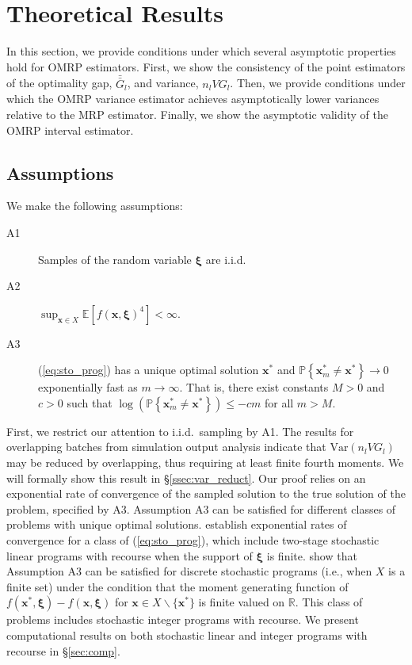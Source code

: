 \documentclass[12pt]{article}
\newcommand{\R}{{\mathbb{R}}}
\newcommand{\p}[1]{\mathbb{P} \left\{ #1 \right\}}
\newcommand{\e}[1]{\mathbb{E} \left[ #1 \right]
}
\newcommand{\var}[1]{\mathrm{Var} \left( #1 \right)}
\newcommand{\x}{\mathbf{x}}
\newcommand{\xs}{\x^*}
\newcommand{\xit}{\boldsymbol{\xi}}
\newcommand{\gb}{\bar{G}}
\newcommand{\gbb}{\bar{\gb}}
\begin{document}
\section{Theoretical Results} 
\label{sec:theory}

In this section, we provide conditions under which several asymptotic properties hold for OMRP estimators. 
First, we show the consistency of the point estimators of the optimality gap, $\gbb_l$, and variance, $n_l VG_l$. 
Then, we provide conditions under which the OMRP variance estimator achieves asymptotically lower variances relative to the MRP estimator.  
Finally, we show the asymptotic validity of the OMRP interval estimator. 

\subsection{Assumptions}
\label{subsec:assumptions}

We make the following assumptions:

\begin{description}
	\item[A1] Samples of the random variable $\xit$ are i.i.d.
	\item[A2] $\sup_{\x \in X} \e{f(\x,\xit)^{4}} < \infty$.
	\item[A3] (\ref{eq:sto_prog}) has a unique optimal solution $\xs$ and $\p{\xs_m \neq \xs} \rightarrow 0$ exponentially fast as $m \rightarrow \infty$.  
           That is, there exist constants $M > 0$ and $c > 0$ such that $\log(\p{\xs_m \neq \xs}) \leq -cm$ for all $m > M$.
\end{description}

First, we restrict our attention to i.i.d.\ sampling by A1.
The results for overlapping batches from simulation output analysis indicate that $\var{n_l VG_l}$ may be reduced by overlapping, thus requiring at least finite fourth moments. 
We will formally show this result in \S\ref{ssec:var_reduct}.
Our proof relies on an exponential rate of convergence of the sampled solution to the true solution of the problem, specified by A3.  
Assumption A3 can be satisfied for different classes of problems with unique optimal solutions.  
\citet{shapiro2000rate} establish exponential rates of convergence for a class of (\ref{eq:sto_prog}), which include two-stage stochastic linear programs with recourse when the support of $\xit$ is finite.   
\citet{kleywegt2002sample} show that Assumption A3 can be satisfied for discrete stochastic programs (i.e., when $X$ is a finite set) under the condition that the moment generating function of $f(\xs,\xit) - f(\x,\xit)$ for $\x \in X \backslash \{\xs\}$ is finite valued on $\R$.  
This class of problems includes stochastic integer programs with recourse.
  We present computational results on both stochastic linear and integer programs with recourse in \S \ref{sec:comp}.
\end{document}

